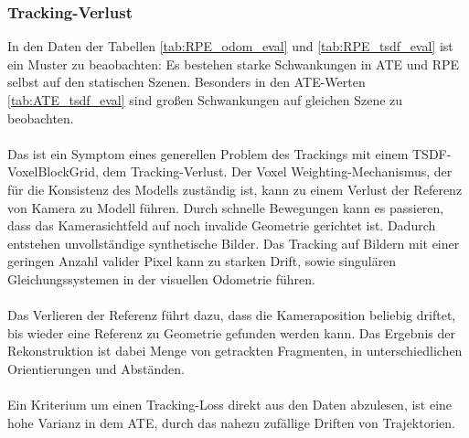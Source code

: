 \documentclass[12pt,DIV=15,BCOR=15mm,twoside,headsepline,abstract=true,listof=totoc,bibliography=totoc]{scrreprt}
\theoremstyle{remark}    %
\begin{document}
    \subsubsection{Tracking-Verlust}
    In den Daten der Tabellen \ref{tab:RPE_odom_eval} und \ref{tab:RPE_tsdf_eval} ist ein Muster zu beaobachten: Es bestehen starke Schwankungen 
    in \ac{ATE} und \ac{RPE} selbst auf den statischen Szenen. Besonders in den ATE-Werten \ref{tab:ATE_tsdf_eval} sind großen Schwankungen auf gleichen Szene
    zu beobachten.\\\\
    Das ist ein Symptom eines generellen Problem des Trackings mit einem \ac{TSDF}-VoxelBlockGrid, dem Tracking-Verlust. 
    Der Voxel Weighting-Mechanismus, der für die Konsistenz des Modells zuständig ist, kann zu einem Verlust der Referenz von Kamera zu Modell führen.
    Durch schnelle Bewegungen kann es passieren, dass das Kamerasichtfeld auf noch invalide Geometrie gerichtet ist. Dadurch entstehen unvollständige 
    synthetische Bilder. Das Tracking auf Bildern mit einer geringen Anzahl valider Pixel kann zu starken Drift, sowie singulären Gleichungssystemen in der 
    visuellen Odometrie führen.\\\\
    Das Verlieren der Referenz führt dazu, dass die Kameraposition beliebig driftet, bis wieder eine Referenz zu Geometrie gefunden werden kann. Das Ergebnis
    der Rekonstruktion ist dabei Menge von getrackten Fragmenten, in unterschiedlichen Orientierungen und Abständen.\\\\
    Ein Kriterium um einen Tracking-Loss direkt aus den Daten abzulesen, ist eine hohe Varianz in dem \ac{ATE}, durch das nahezu zufällige Driften von Trajektorien.
\end{document}
